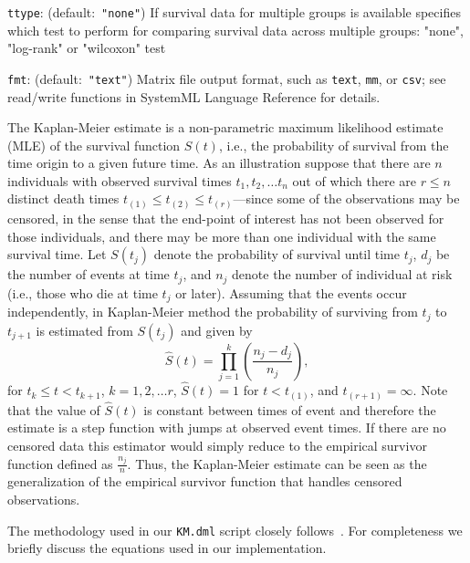 \begin{Description}
\item[{\tt ttype}:](default:\mbox{ }{\tt "none"})
If survival data for multiple groups is available specifies which test to perform for comparing 
survival data across multiple groups: "none", "log-rank" or "wilcoxon" test
\item[{\tt fmt}:] (default:\mbox{ }{\tt "text"})
Matrix file output format, such as {\tt text}, {\tt mm}, or {\tt csv};
see read/write functions in SystemML Language Reference for details.
\end{Description}


\smallskip

The Kaplan-Meier estimate is a non-parametric maximum likelihood estimate (MLE) of the survival function $S(t)$, i.e., the probability of survival from the time origin to a given future time. 
As an illustration suppose that there are $n$ individuals with observed survival times $t_1,t_2,\ldots t_n$ out of which there are $r\leq n$ distinct death times $t_{(1)}\leq t_{(2)}\leq t_{(r)}$---since some of the observations may be censored, in the sense that the end-point of interest has not been observed for those individuals, and there may be more than one individual with the same survival time.
Let $S(t_j)$ denote the probability of survival until time $t_j$, $d_j$ be the number of events at time $t_j$, and $n_j$ denote the number of individual at risk (i.e., those who die at time $t_j$ or later). 
Assuming that the events occur independently, in Kaplan-Meier method the probability of surviving from $t_j$ to $t_{j+1}$ is estimated from $S(t_j)$ and given by
\begin{equation*}
\hat{S}(t) = \prod_{j=1}^{k} \left( \frac{n_j-d_j}{n_j} \right),
\end{equation*}   
for $t_k\leq t<t_{k+1}$, $k=1,2,\ldots r$, $\hat{S}(t)=1$ for $t<t_{(1)}$, and $t_{(r+1)}=\infty$. 
Note that the value of $\hat{S}(t)$ is constant between times of event and therefore
the estimate is a step function with jumps at observed event times.
If there are no censored data this estimator would simply reduce to the empirical survivor function defined as $\frac{n_j}{n}$. Thus, the Kaplan-Meier estimate can be seen as the generalization of the empirical survivor function that handles censored observations.

The methodology used in our {\tt KM.dml} script closely follows~\cite[Sec.~2]{collett2003:kaplanmeier}.
For completeness we briefly discuss the equations used in our implementation.

